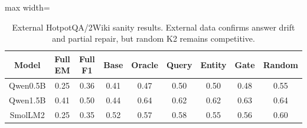 \begin{table}[t]
\centering
\footnotesize
\begin{adjustbox}{max width=\textwidth}
\begin{tabular}{ccccccccc}
\toprule
Model & Full EM & Full F1 & Base & Oracle & Query & Entity & Gate & Random \\
\midrule
Qwen0.5B & 0.25 & 0.36 & 0.41 & 0.47 & 0.50 & 0.50 & 0.48 & 0.55 \\
Qwen1.5B & 0.41 & 0.50 & 0.44 & 0.64 & 0.62 & 0.62 & 0.63 & 0.64 \\
SmolLM2 & 0.25 & 0.35 & 0.52 & 0.57 & 0.58 & 0.55 & 0.56 & 0.60 \\
\bottomrule
\end{tabular}
\end{adjustbox}
\caption{External HotpotQA/2Wiki sanity results. External data confirms answer drift and partial repair, but random K2 remains competitive.}
\label{tab:external}\end{table}
